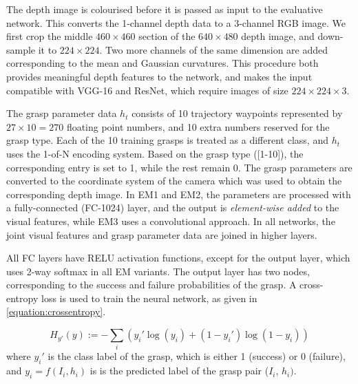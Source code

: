 
The depth image is colourised before it is passed as input to the evaluative network. This converts the 1-channel depth data to a 3-channel RGB image. We first crop the middle $460 \times 460$ section of the $640 \times 480$ depth image, and down-sample it to $224 \times 224$. Two more channels of the same dimension are added corresponding to the mean and Gaussian curvatures. %
This procedure both provides meaningful depth features to the network, and makes the input compatible with VGG-16 and ResNet, which require images of size $224 \times 224 \times 3$.

The grasp parameter data $h_t$ consists of 10 trajectory waypoints represented by $27 \times 10 = 270$ floating point numbers, and 10 extra numbers reserved for the grasp type. Each of the 10 training grasps is treated as a different class, and $h_t$ uses the 1-of-N encoding system. Based on the grasp type ([1-10]), the corresponding entry is set to 1, while the rest remain 0. The grasp parameters are converted to the coordinate system of the camera which was used to obtain the corresponding depth image. In EM1 and EM2, the parameters are processed with a fully-connected (FC-1024) layer, and the output is \textit{element-wise added} to the visual features, while EM3 uses a convolutional approach. In all networks, the joint visual features and grasp parameter data are joined in higher layers.

All FC layers have RELU activation functions, except for the output layer, which uses 2-way softmax in all EM variants. The output layer has two nodes, corresponding to the success and failure probabilities of the grasp. A cross-entropy loss is used to train the neural network, as given in \eq\ref{equation:crossentropy}.

\begin{equation}
H_{y'}(y) := - \sum_{i} ({y_i' \log(y_i) + (1-y_i') \log (1-y_i)})
\label{equation:crossentropy}
\end{equation}
where $y_i'$ is the class label of the grasp, which is either 1 (success) or 0 (failure), and $y_i = f(I_i, h_i)$ is is the predicted label of the grasp pair ($I_i$, $h_i)$.

